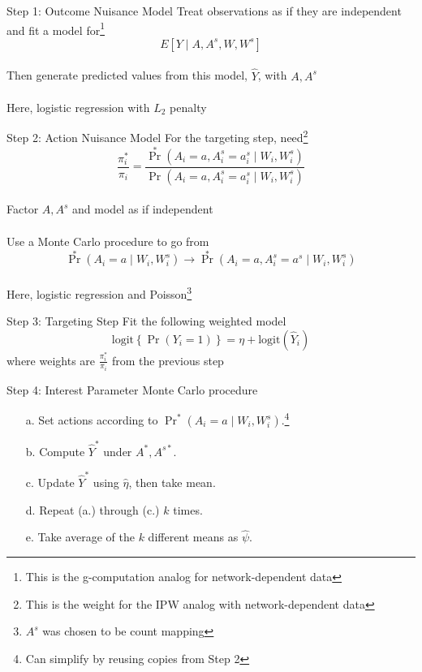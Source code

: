 \documentclass{beamer}
\begin{document}
\begin{frame}{Step 1: Outcome Nuisance Model}
	Treat observations as if they are independent and fit a model for\footnote[frame]{This is the g-computation analog for network-dependent data}
	\begin{equation*}
		E[Y \mid A, A^s, W, W^s]
	\end{equation*}
	~\\
	Then generate predicted values from this model, $\hat{Y}$, with $A, A^s$
	~\\~\\
	Here, logistic regression with $L_2$ penalty
\end{frame}

\begin{frame}{Step 2: Action Nuisance Model}
	For the targeting step, need\footnote[frame]{This is the weight for the IPW analog with network-dependent data}
	\begin{equation*}
		\frac{\pi_i^*}{\pi_i} = \frac{{\Pr}^*(A_i = a, A_i^s = a_i^s \mid W_i, W_i^s)}{\Pr(A_i = a, A_i^s = a_i^s \mid W_i, W_i^s)}
	\end{equation*}
	~\\
	Factor $A,A^s$ and model as if independent
	~\\~\\
	Use a Monte Carlo procedure to go from  
	$${\Pr}^*(A_i = a \mid W_i, W_i^s) \rightarrow {\Pr}^*(A_i = a, A_i^s=a^s \mid W_i, W_i^s)$$
	~\\
	Here, logistic regression and Poisson\footnote[frame]{$A^s$ was chosen to be count mapping}
\end{frame}

\begin{frame}{Step 3: Targeting Step}
	Fit the following weighted model
	\begin{equation*}
		\text{logit}\left\{ \Pr(Y_i = 1) \right\} = \eta + \text{logit}(\hat{Y}_i)
	\end{equation*}
	where weights are $\frac{\pi_i^*}{\pi_i}$ from the previous step
\end{frame}

\begin{frame}{Step 4: Interest Parameter}
	Monte Carlo procedure
	\begin{itemize}
		\item[a.] Set actions according to ${\Pr}^*(A_i = a \mid W_i, W_i^s)$.\footnote[frame]{Can simplify by reusing copies from Step 2}
		\item[b.] Compute $\hat{Y}^*$ under $A^*, A^{s*}$.
		\item[c.] Update $\hat{Y}^*$ using $\hat{\eta}$, then take mean.
		\item[d.] Repeat (a.) through (c.) $k$ times.
		\item[e.] Take average of the $k$ different means as $\hat{\psi}$.
	\end{itemize}
\end{frame}
\end{document}
